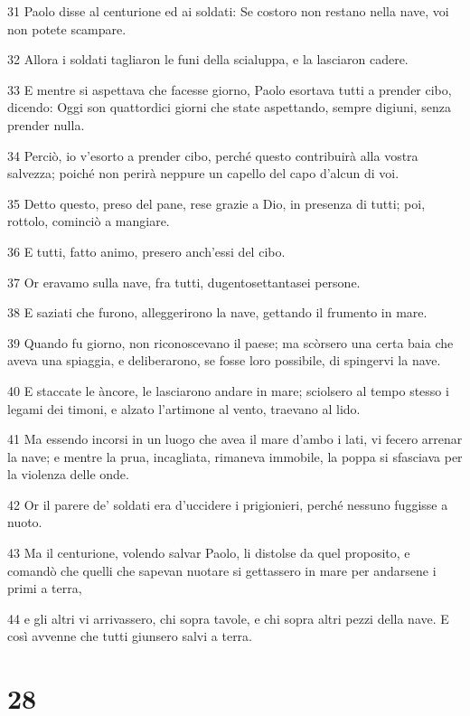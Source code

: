 \par 31 Paolo disse al centurione ed ai soldati: Se costoro non restano nella nave, voi non potete scampare.
\par 32 Allora i soldati tagliaron le funi della scialuppa, e la lasciaron cadere.
\par 33 E mentre si aspettava che facesse giorno, Paolo esortava tutti a prender cibo, dicendo: Oggi son quattordici giorni che state aspettando, sempre digiuni, senza prender nulla.
\par 34 Perciò, io v'esorto a prender cibo, perché questo contribuirà alla vostra salvezza; poiché non perirà neppure un capello del capo d'alcun di voi.
\par 35 Detto questo, preso del pane, rese grazie a Dio, in presenza di tutti; poi, rottolo, cominciò a mangiare.
\par 36 E tutti, fatto animo, presero anch'essi del cibo.
\par 37 Or eravamo sulla nave, fra tutti, dugentosettantasei persone.
\par 38 E saziati che furono, alleggerirono la nave, gettando il frumento in mare.
\par 39 Quando fu giorno, non riconoscevano il paese; ma scòrsero una certa baia che aveva una spiaggia, e deliberarono, se fosse loro possibile, di spingervi la nave.
\par 40 E staccate le àncore, le lasciarono andare in mare; sciolsero al tempo stesso i legami dei timoni, e alzato l'artimone al vento, traevano al lido.
\par 41 Ma essendo incorsi in un luogo che avea il mare d'ambo i lati, vi fecero arrenar la nave; e mentre la prua, incagliata, rimaneva immobile, la poppa si sfasciava per la violenza delle onde.
\par 42 Or il parere de' soldati era d'uccidere i prigionieri, perché nessuno fuggisse a nuoto.
\par 43 Ma il centurione, volendo salvar Paolo, li distolse da quel proposito, e comandò che quelli che sapevan nuotare si gettassero in mare per andarsene i primi a terra,
\par 44 e gli altri vi arrivassero, chi sopra tavole, e chi sopra altri pezzi della nave. E così avvenne che tutti giunsero salvi a terra.

\chapter{28}

